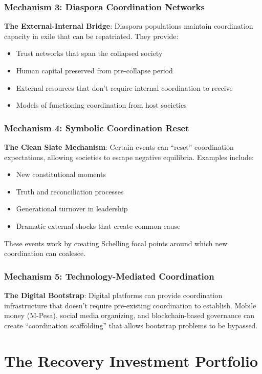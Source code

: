 \documentclass[11pt,letterpaper]{article}
\begin{document}
\subsubsection{Mechanism 3: Diaspora Coordination Networks}
\textbf{The External-Internal Bridge}: Diaspora populations maintain coordination capacity in exile that can be repatriated. They provide:
\begin{itemize}
\item Trust networks that span the collapsed society
\item Human capital preserved from pre-collapse period
\item External resources that don't require internal coordination to receive
\item Models of functioning coordination from host societies
\end{itemize}

\subsubsection{Mechanism 4: Symbolic Coordination Reset}
\textbf{The Clean Slate Mechanism}: Certain events can ``reset'' coordination expectations, allowing societies to escape negative equilibria. Examples include:
\begin{itemize}
\item New constitutional moments
\item Truth and reconciliation processes
\item Generational turnover in leadership
\item Dramatic external shocks that create common cause
\end{itemize}

These events work by creating Schelling focal points around which new coordination can coalesce.

\subsubsection{Mechanism 5: Technology-Mediated Coordination}
\textbf{The Digital Bootstrap}: Digital platforms can provide coordination infrastructure that doesn't require pre-existing coordination to establish. Mobile money (M-Pesa), social media organizing, and blockchain-based governance can create ``coordination scaffolding'' that allows bootstrap problems to be bypassed.

\section{The Recovery Investment Portfolio}
\end{document}
